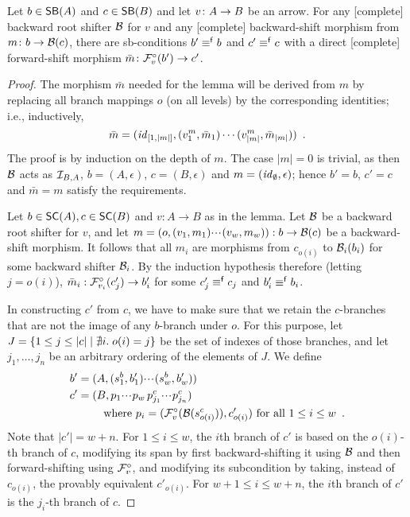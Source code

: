 \begin{lemma}
Let $b\in \SB A$ and $c\in \SB B$ and let $v\colon A\rightarrow B$ be an arrow. For any [complete] backward root shifter $\mathcal{B}$ for $v$ and any [complete] backward-shift morphism from $m\colon b \rightarrow\mathcal{B}(c)$, there are sb-conditions $b'\equiv^{\mathsf f} b$ and $c'\equiv^{\mathsf f} c$ with a direct [complete] forward-shift morphism $\bar m\colon\mathcal{F}^\circ_{v}(b')\rightarrow c'$.
\end{lemma}
%
\begin{proof}
The morphism $\bar m$ needed for the lemma will be derived from $m$ by replacing all branch mappings $o$ (on all levels) by the corresponding identities; i.e., inductively,
\[ \bar m=(\mathit{id}_{[1,|m|]},(v^m_1,\bar m_1)\cdots (v^m_{|m|},\bar m_{|m|})) \enspace. \]
The proof is by induction on the depth of $m$. The case $|m|=0$ is trivial, as then $\mathcal{B}$ acts as $\mathcal{I}_{B,A}$, $b=(A,\epsilon)$, $c=(B,\epsilon)$ and $m=(\mathit{id}_\emptyset,\epsilon)$; hence $b'=b$, $c'=c$ and $\bar m=m$ satisfy the requirements.

\smallskip
Let $b\in \SC A,c\in \SC B$ and $v:A\to B$ as in the lemma. Let $\mathcal{B}$ be a backward root shifter for $v$, and let $m=(o,(v_1,m_1){\cdotp\mkern-2mu\cdotp\mkern-2mu\cdotp\mkern1mu}(v_w,m_w)): b \rightarrow \mathcal{B}(c)$ be a backward-shift morphism. It follows that all $m_i$ are morphisms from $c_{o(i)}$ to $\mathcal{B}_i(b_i)$ for some backward shifter $\mathcal{B}_i$. By the induction hypothesis therefore (letting $j=o(i)$), $\bar m_i:\mathcal{F}^\circ_{v_i}(c_j')\rightarrow b_i'$ for some $c_j'\equiv^{\mathsf f} c_j$ and $b'_i\equiv^{\mathsf f} b_i$.

\smallskip
In constructing $c'$ from $c$, we have to make sure that we retain the $c$-branches that are not the image of any $b$-branch under $o$. For this purpose, let $J=\{{1\leq j\leq |c|\mid \nexists i.\; o(i)=j}\}$ be the set of indexes of those branches, and let $j_1,\ldots,j_n$ be an arbitrary ordering of the elements of $J$. We define 
\begin{align*}
b'=\;&(A,(s^b_1,b'_1){\cdotp\mkern-2mu\cdotp\mkern-2mu\cdotp\mkern1mu} (s^b_w,b'_w)) \\
c'=\;&(B,p_1{\cdotp\mkern-2mu\cdotp\mkern-2mu\cdotp\mkern1mu} p_w\,p^c_{j_1}{\cdotp\mkern-2mu\cdotp\mkern-2mu\cdotp\mkern1mu} p^c_{j_n}) \\
   & \quad\text{where } p_i = (\mathcal{F}^\circ_{v}(\mathcal{B}(s^c_{o(i)})),c'_{o(i)}) \text{ for all $1\leq i\leq w$}\enspace.
\end{align*}
%
Note that $|c'|=w+n$. For $1\leq i\leq w$, the $i$th branch of $c'$ is based on the $o(i)$-th branch of $c$, modifying its span by first backward-shifting it using $\mathcal{B}$ and then forward-shifting using $\mathcal{F}^\circ_{v}$, and modifying its subcondition by taking, instead of $c_{o(i)}$, the provably equivalent $c'_{o(i)}$. For $w+1\leq i\leq w+n$, the $i$th branch of $c'$ is the $j_i$-th branch of $c$.


\end{proof}
